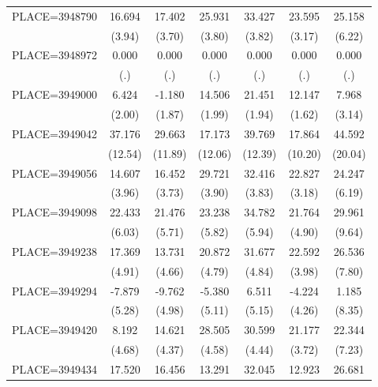 {\begin{tabular}{l*{6}{c}}
PLACE=3948790       &      16.694&      17.402&      25.931&      33.427&      23.595&      25.158\\
                    &      (3.94)&      (3.70)&      (3.80)&      (3.82)&      (3.17)&      (6.22)\\
PLACE=3948972       &       0.000&       0.000&       0.000&       0.000&       0.000&       0.000\\
                    &         (.)&         (.)&         (.)&         (.)&         (.)&         (.)\\
PLACE=3949000       &       6.424&      -1.180&      14.506&      21.451&      12.147&       7.968\\
                    &      (2.00)&      (1.87)&      (1.99)&      (1.94)&      (1.62)&      (3.14)\\
PLACE=3949042       &      37.176&      29.663&      17.173&      39.769&      17.864&      44.592\\
                    &     (12.54)&     (11.89)&     (12.06)&     (12.39)&     (10.20)&     (20.04)\\
PLACE=3949056       &      14.607&      16.452&      29.721&      32.416&      22.827&      24.247\\
                    &      (3.96)&      (3.73)&      (3.90)&      (3.83)&      (3.18)&      (6.19)\\
PLACE=3949098       &      22.433&      21.476&      23.238&      34.782&      21.764&      29.961\\
                    &      (6.03)&      (5.71)&      (5.82)&      (5.94)&      (4.90)&      (9.64)\\
PLACE=3949238       &      17.369&      13.731&      20.872&      31.677&      22.592&      26.536\\
                    &      (4.91)&      (4.66)&      (4.79)&      (4.84)&      (3.98)&      (7.80)\\
PLACE=3949294       &      -7.879&      -9.762&      -5.380&       6.511&      -4.224&       1.185\\
                    &      (5.28)&      (4.98)&      (5.11)&      (5.15)&      (4.26)&      (8.35)\\
PLACE=3949420       &       8.192&      14.621&      28.505&      30.599&      21.177&      22.344\\
                    &      (4.68)&      (4.37)&      (4.58)&      (4.44)&      (3.72)&      (7.23)\\
PLACE=3949434       &      17.520&      16.456&      13.291&      32.045&      12.923&      26.681\\

\end{tabular}}
